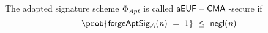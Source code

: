 \begin{definition}[$\cnstaEUFCMA$]
    \begin{center}
        \fbox{
        \begin{varwidth}{\textwidth}
            \procedure[linenumbering]{$\procExpForg{\varN}$} {
            \varSet \opAssign \cnstEmptySet \\
            \varKeyPairBob \opFunResult \procSetup{\varSecParam} \\
            (\varMsg \opSeperate \varSecKeyAlice) \opFunResult \cnstAdversary^{\procSignOracle{\cdot}{\cdot}}(\varPubKeyBob) \\
            (\varWit \opSeperate \varStatement) \opFunResult \procGenR{\varSecParam} \\
            (\varSigAlice \opSeperate \varSigBob) \opFunResult \procSignPt{\varMsg}{\varSecKeyAlice}{\varSecKeyBob} \\
            \varSigAptBob \opFunResult \procAptSig{\varSigBob}{\varWit} \\
            \funStar{\varSigAlice} \opFunResult \cnstAdversary^{\procSignOracle{\cdot}{\cdot}}(\varSigBob) \\
            \varSigFin \opFunResult \procFinSig{\funStar{\varSigAlice}}{\varSigBob} \\
            \pcreturn ((\varMsg) \opNotIn \varSet \opAnd \funStar{\varSigAlice} \opNotEq \varSigAlice \opAnd \procVerf{\varMsg}{\varSigFin}{\varPubKeyAlice \opAddPoint \varPubKeyBob})
            }\\[2\baselineskip]
            \procedure[linenumbering]{$\procSignOracle{\varMsg}{\varPubKeyAlice}$} {
            (\varWit \opSeperate \varStatement) \opFunResult \procGenR{\varSecParam} \\
            (\varSigAlice \opSeperate \varSigBob) \opFunResult \procSignPt{\varMsg}{\varSecKeyAlice}{\varSecKeyBob} \\
            \varSigAptBob \opFunResult \procAptSig{\varSigPt}{\varWit} \\
            \varSigFin \opFunResult \procFinSig{\varSigAlice}{\varSigAptBob} \\
            \varSet \opAssign \varSet \opUnion \{\varMsg\} \\
            \pcreturn (\varSigFin \opSeperate \varStatement)
            }\\[2\baselineskip]
        \end{varwidth}
        }
    \end{center}
    The adapted signature scheme $\Phi_{\mathit{Apt}}$ is called $\cnstaEUFCMA$-secure if
    \[ \prob{\procExpForg{\varN} \opEqNoQ 1} \opSmEq \funNegl{\varN} \]
\end{definition}

